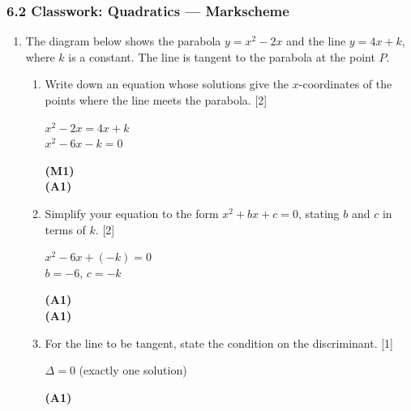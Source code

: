 \documentclass[12pt, twoside]{article}
\begin{document}
\subsubsection*{6.2 Classwork: Quadratics --- Markscheme}

\begin{enumerate}[itemsep=0.2cm]

\item The diagram below shows the parabola $y = x^2 - 2x$ and the line $y = 4x + k$,
where $k$ is a constant. The line is tangent to the parabola at the point $P$.

\begin{enumerate}[itemsep=0.3cm]
  \item Write down an equation whose solutions give the $x$-coordinates of
        the points where the line meets the parabola. \hfill [2]

  \begin{minipage}[t]{0.62\textwidth}
  $x^2 - 2x = 4x + k$\\[0.15cm]
  $x^2 - 6x - k = 0$
  \end{minipage}%
  \begin{minipage}[t]{0.35\textwidth}\raggedleft
  \textbf{(M1)}\\[0.15cm]
  \textbf{(A1)}
  \end{minipage}

  \medskip
  \item Simplify your equation to the form $x^2 + bx + c = 0$, stating $b$
        and $c$ in terms of $k$. \hfill [2]

  \begin{minipage}[t]{0.62\textwidth}
  $x^2 - 6x + (-k) = 0$\\[0.15cm]
  $b = -6$, \quad $c = -k$
  \end{minipage}%
  \begin{minipage}[t]{0.35\textwidth}\raggedleft
  \textbf{(A1)}\\[0.15cm]
  \textbf{(A1)}
  \end{minipage}

  \medskip
  \item For the line to be tangent, state the condition on the discriminant. \hfill [1]

  \begin{minipage}[t]{0.62\textwidth}
  $\Delta = 0$ \quad (exactly one solution)
  \end{minipage}%
  \begin{minipage}[t]{0.35\textwidth}\raggedleft
  \textbf{(A1)}
  \end{minipage}


\end{enumerate}
\end{enumerate}
\end{document}
